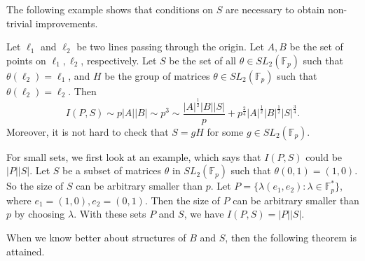 \documentclass[11pt]{article}
\def\thang#1{\noindent
\textcolor{blue}
{\textsc{(Thang:}
\textsf{#1})}}
\def\thang#1{\noindent
\textcolor{blue}
{\textsc{(Thang:}
\textsf{#1})}}
\def\Fbb{\mathbb{F}}
\def\SL{SL}
\begin{document}
The following example shows that conditions on $S$ are necessary to obtain non-trivial improvements.

Let $\ell_1$ and $\ell_2$ be two lines passing through the origin. Let $A, B$ be the set of points on $\ell_1, \ell_2$, respectively. Let $S$ be the set of all $\theta\in SL_2(\mathbb{F}_p)$ such that $\theta(\ell_2)=\ell_1$, and $H$ be the group of matrices $\theta\in SL_2(\mathbb{F}_p)$ such that $\theta(\ell_2)=\ell_2$. Then 
\[ I(P,S) \sim p|A||B| \sim p^3  \sim \frac{|A|^{\frac{1}{2}}|B||S|}{p} + p^{\frac{2}{4}}|A|^{\frac{1}{2}}|B|^{\frac{1}{2}}|S|^{\frac{3}{4}}   . \]
Moreover, it is not hard to check that $S=gH$ for some $g\in \SL_2(\Fbb_p)$.





For small sets, we first look at an example, which says that $I(P, S)$ could be $|P||S|$. Let $S$ be a subset of matrices $\theta$ in $SL_2(\mathbb{F}_p)$ such that $\theta(0, 1)=(1, 0)$. So the size of $S$ can be arbitrary smaller than $p$. Let $P=\{ \lambda(e_1, e_2)\colon \lambda\in \mathbb{F}_p^*\}$, where $e_1=(1, 0), e_2=(0, 1)$. Then the size of $P$ can be arbitrary smaller than $p$ by choosing $\lambda$. With these sets $P$ and $S$, we have $I(P, S)=|P||S|$.

When we know better about structures of $B$ and $S$, then the following theorem is attained. 
\end{document}

